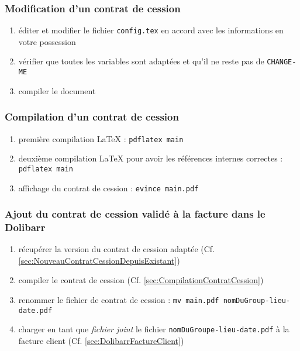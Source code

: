 \documentclass[a4paper]{article}
\begin{document}
\subsubsection{Modification d'un contrat de cession}
\label{sec:ModificationContratCession}
\begin{enumerate}
    \item éditer et modifier le fichier \lstinline{config.tex}
    en accord avec les informations en votre possession
    \item vérifier que toutes les variables sont adaptées et qu'il ne
    reste pas de \lstinline{CHANGE-ME}
    \item compiler le document
\end{enumerate}

\subsubsection{Compilation d'un contrat de cession}
\label{sec:CompilationContratCession}
\begin{enumerate}
    \item première compilation LaTeX : \lstinline{pdflatex main}
    \item deuxième compilation LaTeX pour avoir les références
    internes correctes : \lstinline{pdflatex main}
    \item affichage du contrat de cession :
    \lstinline{evince main.pdf}
\end{enumerate}

\subsubsection{Ajout du contrat de cession validé à la facture dans le Dolibarr}
\label{sec:DolibarrContratCession}
\begin{enumerate}
    \item récupérer la version du contrat de cession adaptée
    (Cf. \vref{sec:NouveauContratCessionDepuisExistant})
    \item compiler le contrat de cession (Cf. \vref{sec:CompilationContratCession})
    \item renommer le fichier de contrat de cession :
    \lstinline{mv main.pdf nomDuGroup-lieu-date.pdf}
    \item charger en tant que \emph{fichier joint} le fichier
    \lstinline{nomDuGroupe-lieu-date.pdf} à la facture client (Cf. \vref{sec:DolibarrFactureClient})
\end{enumerate}
\end{document}
